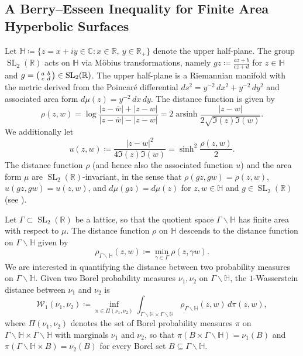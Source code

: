 \documentclass[11pt,a4paper]{amsart}
\newcommand{\C}{\mathbb{C}}
\newcommand{\Hb}{\mathbb{H}}
\newcommand{\R}{\mathbb{R}}
\newcommand{\Wscr}{\mathscr{W}}
\DeclareMathOperator{\arsinh}{arsinh}
\DeclareMathOperator{\SL}{SL}
\numberwithin{equation}{section}
\theoremstyle{remark}
\theoremstyle{definition}
\begin{document}
\subsection{A Berry--Esseen Inequality for Finite Area Hyperbolic Surfaces}

Let $\Hb \coloneqq \{z = x + iy \in \C : x \in \R, \ y \in \R_+\}$ denote the upper half-plane. The group $\SL_2(\R)$ acts on $\Hb$ via M\"{o}bius transformations, namely $gz \coloneqq \frac{az + b}{cz + d}$ for $z \in \Hb$ and $g = \begin{psmallmatrix} a & b \\ c & d \end{psmallmatrix} \in \SL_2(\R)$. The upper half-plane is a Riemannian manifold with the metric derived from the Poincar\'{e} differential $ds^2 = y^{-2} \, dx^2 + y^{-2} \, dy^2$ and associated area form $d\mu(z) = y^{-2} \, dx \, dy$. The distance function is given by
\begin{equation}
\label{eqn:rhodefeq}
\rho(z,w) = \log \frac{|z - \overline{w}| + |z - w|}{|z - \overline{w}| - |z - w|} = 2 \arsinh \frac{|z - w|}{2 \sqrt{\Im(z) \Im(w)}}.
\end{equation}
We additionally let
\begin{equation}
\label{eqn:udefeq}
u(z,w) \coloneqq \frac{|z - w|^2}{4 \Im(z) \Im(w)} = \sinh^2 \frac{\rho(z,w)}{2}.
\end{equation}
The distance function $\rho$ (and hence also the associated function $u$) and the area form $\mu$ are $\SL_2(\R)$-invariant, in the sense that $\rho(gz,gw) = \rho(z,w)$, $u(gz,gw) = u(z,w)$, and $d\mu(gz) = d\mu(z)$ for $z,w \in \Hb$ and $g \in \SL_2(\R)$ (see \cite[Chapter 1]{Iwa02}).

Let $\Gamma \subset \SL_2(\R)$ be a lattice, so that the quotient space $\Gamma \backslash \Hb$ has finite area with respect to $\mu$. The distance function $\rho$ on $\Hb$ descends to the distance function on $\Gamma \backslash \Hb$ given by
\[\rho_{\Gamma \backslash \Hb}(z,w) \coloneqq \min_{\gamma \in \Gamma} \rho(z,\gamma w).\]
We are interested in quantifying the distance between two probability measures on $\Gamma \backslash \Hb$. Given two Borel probability measures $\nu_1,\nu_2$ on $\Gamma \backslash \Hb$, the $1$-Wasserstein distance between $\nu_1$ and $\nu_2$ is
\[\Wscr_1(\nu_1,\nu_2) \coloneqq \inf_{\pi \in \Pi(\nu_1,\nu_2)} \int_{\Gamma \backslash \Hb \times \Gamma \backslash \Hb} \rho_{\Gamma \backslash \Hb}(z,w) \, d\pi(z,w),\]
where $\Pi(\nu_1,\nu_2)$ denotes the set of Borel probability measures $\pi$ on $\Gamma \backslash \Hb \times \Gamma \backslash \Hb$ with marginals $\nu_1$ and $\nu_2$, so that $\pi(B \times \Gamma \backslash \Hb) = \nu_1(B)$ and $\pi(\Gamma \backslash \Hb \times B) = \nu_2(B)$ for every Borel set $B \subseteq \Gamma \backslash \Hb$.
\end{document}
